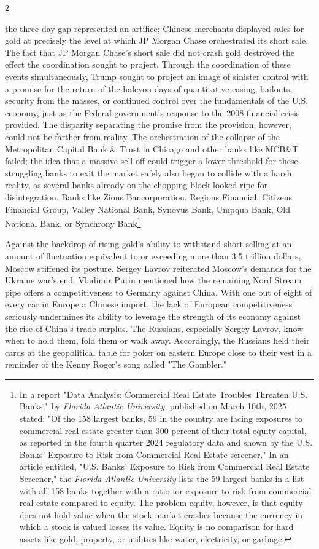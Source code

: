 \documentclass[10pt,a4paper,twoside]{article} %
\begin{document}
\begin{multicols}{2}
{the three day gap represented an artifice; Chinese merchants displayed sales for gold at precisely the level at which JP Morgan Chase orchestrated its short sale. The fact that JP Morgan Chase's short sale did not crash gold destroyed the effect the coordination sought to project. Through the coordination of these events simultaneously, Trump sought to project an image of sinister control with a promise for the return of the halcyon days of quantitative easing, bailouts, security from the masses, or continued control over the fundamentals of the U.S. economy, just as the Federal government's response to the 2008 financial crisis provided. The disparity separating the promise from the provision, however, could not be farther from reality. The orchestration of the collapse of the Metropolitan Capital Bank \& Trust in Chicago and other banks like MCB\&T failed; the idea that a massive sell-off could trigger a lower threshold for these struggling banks to exit the market safely also began to collide with a harsh reality, as several banks already on the chopping block looked ripe for disintegration. Banks like Zions Bancorporation, Regions Financial, Citizens Financial Group, Valley National Bank, Synovus Bank, Umpqua Bank, Old National Bank, or Synchrony Bank\footnote{In a report "Data Analysis: Commercial Real Estate Troubles Threaten U.S. Banks," by \emph{Florida Atlantic University}, published on March 10th, 2025 stated: "Of the 158 largest banks, 59 in the country are facing exposures to commercial real estate greater than 300 percent of their total equity capital, as reported in the fourth quarter 2024 regulatory data and shown by the U.S. Banks’ Exposure to Risk from Commercial Real Estate screener." In an article entitled, "U.S. Banks’ Exposure to Risk from Commercial Real Estate Screener," the \emph{Florida Atlantic University} lists the 59 largest banks in a list with all 158 banks together with a ratio for exposure to risk from commercial real estate compared to equity. The problem equity, however, is that equity does not hold value when the stock market crashes because the currency in which a stock is valued losses its value. Equity is no comparison for hard assets like gold, property, or utilities like water, electricity, or garbage.}

\newline \indent Against the backdrop of rising gold’s ability to withstand short selling at an amount of fluctuation equivalent to or exceeding more than 3.5 trillion dollars, Moscow stiffened its posture. Sergey Lavrov reiterated Moscow's demands for the Ukraine war's end. Vladimir Putin mentioned how the remaining Nord Stream pipe offers a competitiveness to Germany against China. With one out of eight of every car in Europe a Chinese import, the lack of European competitiveness seriously undermines its ability to leverage the strength of its economy against the rise of China's trade surplus. The Russians, especially Sergey Lavrov, know when to hold them, fold them or walk away.  Accordingly, the Russians held their cards at the geopolitical table for poker on eastern Europe close to their vest in a reminder of the Kenny Roger's song called "The Gambler." 
}


\end{multicols}
\end{document}
